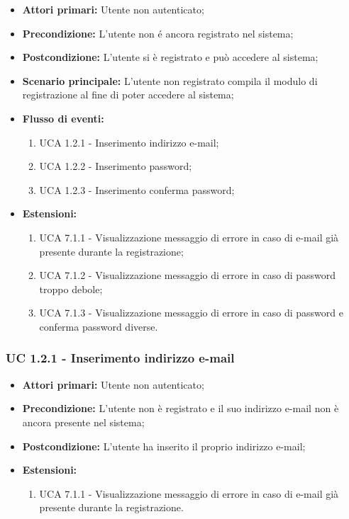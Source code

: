 \begin{itemize}
\item \textbf{Attori primari:} Utente non autenticato;
\item \textbf{Precondizione:} L'utente non é ancora registrato nel sistema;
\item \textbf{Postcondizione:} L'utente si è registrato e può accedere al sistema;
\item \textbf{Scenario principale:} L'utente non registrato compila il modulo di registrazione al fine di poter accedere al sistema;%
\item \textbf{Flusso di eventi:} %
  \begin{enumerate}
        \item UCA 1.2.1 - Inserimento indirizzo e-mail;
        \item UCA 1.2.2 - Inserimento password;
        \item UCA 1.2.3 - Inserimento conferma password;
    \end{enumerate}
\item \textbf{Estensioni:}
	\begin{enumerate}
		\item UCA 7.1.1 - Visualizzazione messaggio di errore in caso di e-mail già presente durante la registrazione;
		\item UCA 7.1.2 - Visualizzazione messaggio di errore in caso di password troppo debole;
		\item UCA 7.1.3 - Visualizzazione messaggio di errore in caso di password e conferma password diverse. 
	\end{enumerate}
\end{itemize}

\subsubsection{UC 1.2.1 - Inserimento indirizzo e-mail}%

\begin{itemize}
\item \textbf{Attori primari:} Utente non autenticato;
\item \textbf{Precondizione:} L'utente non è registrato e il suo indirizzo e-mail non è ancora presente nel sistema;
\item \textbf{Postcondizione:} L'utente ha inserito il proprio indirizzo e-mail;
\item \textbf{Estensioni:}
	\begin{enumerate}
		\item UCA 7.1.1 - Visualizzazione messaggio di errore in caso di e-mail già presente durante la registrazione.
	\end{enumerate}
\end{itemize}


